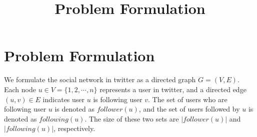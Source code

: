 \documentclass{article}
\begin{document}
\title{Problem Formulation}
\maketitle \else \fi

\newcommand{\following}{\ensuremath{following}}
\newcommand{\follower}{\ensuremath{follower}}

\section{Problem Formulation}\label{sec:problem}
We formulate the social network in twitter as a directed graph $G = (V,E)$.
Each node $u \in V = \{1, 2, \cdots, n\}$ represents a user in twitter, and a directed edge $(u,v) \in E$ indicates
user $u$ is following user $v$. The set of users who are following user $u$ is denoted as $\follower(u)$, and the set of users followed by $u$ is denoted as $\following(u)$. The size of these two sets are $|\follower(u)|$ and $|\following(u)|$, respectively.



\end{document}
